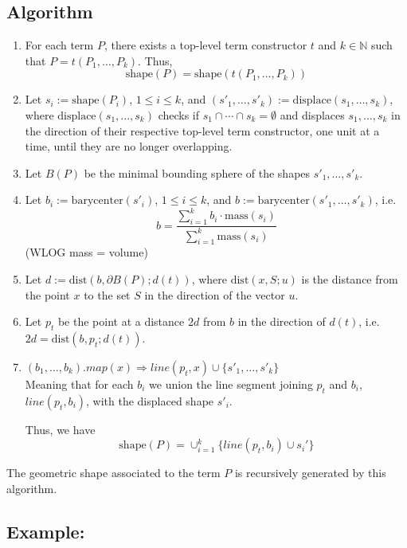 \documentclass[12pt]{article}
\newcommand{\NN}{\mathbb{N}}
\numberwithin{equation}{section}
\begin{document}
\subsection*{Algorithm}
\begin{enumerate}
\item For each term $P$, there exists a top-level term constructor $t$ and $k \in \NN$ such that $P = t(P_1, \dots, P_k)$. Thus,
\[ \text{shape}(P) = \text{shape}( t(P_1, \dots, P_k) ) \]

\item Let $s_i := \text{shape}(P_i)$, $1 \leq i \leq k$, and $(s'_1, \dots, s'_k) := \text{displace}(s_1, \dots, s_k)$, where $\text{displace}(s_1, ..., s_k)$ checks if $s_1 \cap \cdots \cap s_k = \emptyset$ and displaces $s_1, \dots, s_k$ in the direction of their respective top-level term constructor, one unit at a time, until they are no longer overlapping.

\item Let $B(P)$ be the minimal bounding sphere of the shapes $s'_1, \dots, s'_k$. 

\item Let $b_i := \text{barycenter}(s'_i)$, $1 \leq i \leq k$, and $b := \text{barycenter}(s'_1, \dots, s'_k)$, i.e.
\[ b = \frac{\sum_{i=1}^k b_i \cdot \text{mass}(s_i)}{\sum_{i=1}^k \text{mass}(s_i)} \]
(WLOG mass = volume)

\item Let $d := \text{dist}(b, \partial B(P); d(t))$, where $\text{dist}(x,S;u)$ is the distance from the point $x$ to the set $S$ in the direction of the vector $u$.

\item Let $p_t$ be the point at a distance $2d$ from $b$ in the direction of $d(t)$, i.e. $2d = \text{dist}(b, p_t; d(t))$.

\item $(b_1, \dots, b_k).map(x) \Rightarrow line(p_t, x) \cup \{s'_1, \dots, s'_k \}$ \\
Meaning that for each $b_i$ we union the line segment joining $p_t$ and $b_i$, $line(p_t, b_i)$, with the displaced shape $s'_i$.

Thus, we have
\[ \text{shape}(P) = \cup_{i=1}^{k} \{ line(p_t, b_i)  \cup s_i' \} \]
\end{enumerate}

The geometric shape associated to the term $P$ is recursively generated by this algorithm.

\subsection*{Example:}
\end{document}
